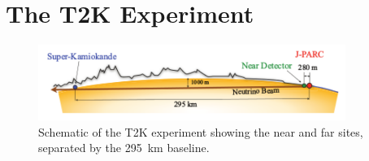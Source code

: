 \chapter{The T2K Experiment}
\label{chap:T2KExperiment}
\begin{figure}
  \centering
  \includegraphics[width=10cm]{images/t2k/t2k_schematic.pdf}
  \caption{Schematic of the T2K experiment showing the near and far sites, separated by the 295~km baseline.}
  \label{fig:T2KSchematic}
\end{figure}


